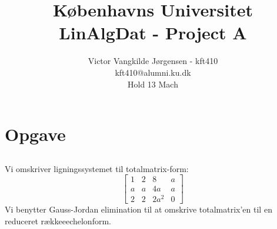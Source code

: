 \documentclass[a4paper,12pt]{article}
\title{Københavns Universitet\\
LinAlgDat - Project A}
\author{Victor Vangkilde Jørgensen - kft410\\ 
kft410@alumni.ku.dk\\
Hold 13 Mach}
\begin{document}
 
 
\maketitle 

\section[Opgave]{Opgave}
\subsection{}
Vi omskriver ligningssystemet til totalmatrix-form:
\[
\left[\begin{array}{ccc|c}
    1 & 2 & 8 & a \\
    a & a & 4a & a \\
    2 & 2 & 2a^2 & 0
\end{array}\right]
\]
Vi benytter Gauss-Jordan elimination til at omskrive totalmatrix'en til en reduceret rækkeeechelonform.\\
\end{document}
